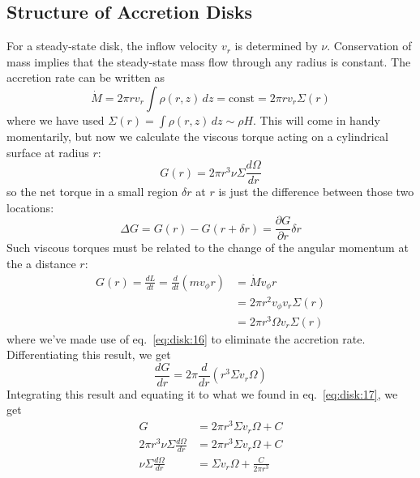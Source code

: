 \documentclass[10pt]{article}
\numberwithin{equation}{section}
\begin{document}
	\subsection{Structure of Accretion Disks} %
	\label{sub:structure_of_accretion_disks}
	For a steady-state disk, the inflow velocity $v_r$ is determined by $\nu$. Conservation of mass implies that the steady-state mass flow through any radius is constant. The accretion rate can be written as
	\begin{equation}
		\label{eq:disk:16} \dot{M} = 2\pi r v_r\int \rho(r,z)\,dz = \mathrm{const} = 2\pi r v_r \Sigma(r)
	\end{equation}
	where we have used $\Sigma(r) = \int \rho(r,z)\,dz\sim \rho H$. This will come in handy momentarily, but now we calculate the viscous torque acting on a cylindrical surface at radius $r$:
	\begin{equation}
		\label{eq:disk:17} G(r) = 2\pi r^3\nu \Sigma \frac{d\Omega}{dr}
	\end{equation}
	so the net torque in a small region $\delta r$ at $r$ is just the difference between those two locations:
	\begin{equation}
		\label{eq:disk:18} \Delta G = G(r)-G(r+\delta r) = \frac{\partial G}{\partial r}\delta r
	\end{equation}
	Such viscous torques must be related to the change of the angular momentum at the a distance $r$:
	\begin{align}
		\label{eq:disk:19} G(r) = \frac{dL}{dt} = \frac{d}{dt}(mv_\phi r) &= \dot{M} v_\phi r\\
		\label{eq:disk:20} & = 2\pi r^2 v_\phi v_r \Sigma(r)\\
		\label{eq:disk:21} & = 2\pi r^3 \Omega v_r \Sigma(r)
	\end{align}
	where we've made use of eq.~\eqref{eq:disk:16} to eliminate the accretion rate. Differentiating this result, we get
	\begin{equation}
		\label{eq:disk:22} \frac{dG}{dr} = 2\pi \frac{d}{dr}\left(r^3\Sigma v_r \Omega\right)
	\end{equation}
	Integrating this result and equating it to what we found in eq.~\eqref{eq:disk:17}, we get
	\begin{align}
		\label{eq:disk:23} G &= 2\pi r^3 \Sigma v_r \Omega + C\\
		\label{eq:disk:24} 2\pi r^3 \nu \Sigma \frac{d\Omega}{dr} &= 2\pi r^3 \Sigma v_r\Omega + C\\
		\label{eq:disk:25} \nu \Sigma \frac{d\Omega}{dr} &= \Sigma v_r\Omega + \frac{C}{2\pi r^3}
	\end{align}
\end{document}
